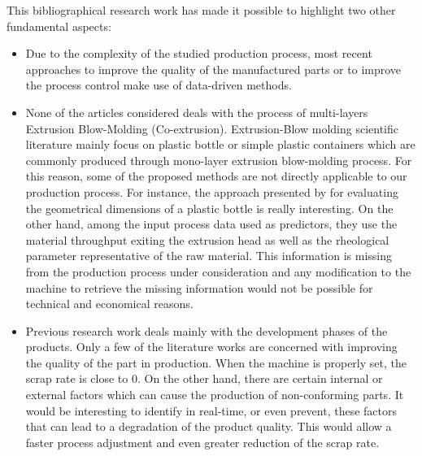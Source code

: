 This bibliographical research work has made it possible to highlight two other fundamental aspects:

\begin{itemize}
    \item Due to the complexity of the studied production process, most recent approaches to improve the quality of the manufactured parts or to improve the process control make use of data-driven methods.
    \item None of the articles considered deals with the process of multi-layers Extrusion Blow-Molding (Co-extrusion). Extrusion-Blow molding scientific literature mainly focus on plastic bottle or simple plastic containers which are commonly produced through mono-layer extrusion blow-molding process. For this reason, some of the proposed methods are not directly applicable to our production process. For instance, the approach presented by \citep{diraddo1993line} for evaluating the geometrical dimensions of a plastic bottle is really interesting. On the other hand, among the input process data used as predictors, they use the material throughput exiting the extrusion head as well as the rheological parameter representative of the raw material. This information is missing from the production process under consideration and any modification to the machine to retrieve the missing information would not be possible for technical and economical reasons.
    \item Previous research work deals mainly with the development phases of the products. Only a few of the literature works are concerned with improving the quality of the part in production. When the machine is properly set, the scrap rate is close to $0$. On the other hand, there are certain internal or external factors which can cause the production of non-conforming parts. It would be interesting to identify in real-time, or even prevent, these factors that can lead to a degradation of the product quality. This would allow a faster process adjustment and even greater reduction of the scrap rate.
\end{itemize}

